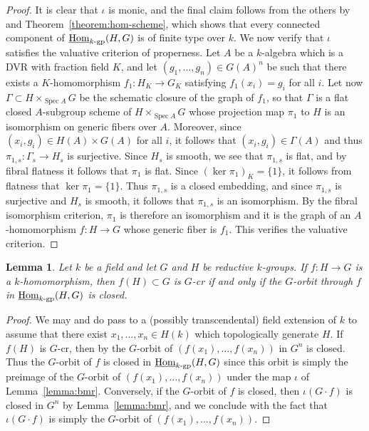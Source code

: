 \documentclass[11pt, letterpaper,english]{amsart}
\theoremstyle{plain}
\newtheorem{lemma}[lem]{Lemma}
\theoremstyle{definition}
\numberwithin{equation}{section}
\numberwithin{lem}{section}
\DeclareMathOperator{\Hom}{Hom}
\DeclareMathOperator{\Spec}{Spec}
\begin{document}
\begin{proof}
    It is clear that $\iota$ is monic, and the final claim follows from the others by \cite[IV\textsubscript{3}, Proposition 8.11.5]{EGA} and Theorem~\ref{theorem:hom-scheme}, which shows that every connected component of $\underline{\Hom}_{k\textrm{-}\rm{gp}}(H, G)$ is of finite type over $k$. We now verify that $\iota$ satisfies the valuative criterion of properness. Let $A$ be a $k$-algebra which is a DVR with fraction field $K$, and let $(g_1, \dots, g_n) \in G(A)^n$ be such that there exists a $K$-homomorphism $f_1: H_K \to G_K$ satisfying $f_1(x_i) = g_i$ for all $i$. Let now $\Gamma \subset H \times_{\Spec A} G$ be the schematic closure of the graph of $f_1$, so that $\Gamma$ is a flat closed $A$-subgroup scheme of $H \times_{\Spec A} G$ whose projection map $\pi_1$ to $H$ is an isomorphism on generic fibers over $A$. Moreover, since $(x_i, g_i) \in H(A) \times G(A)$ for all $i$, it follows that $(x_i, g_i) \in \Gamma(A)$ and thus $\pi_{1,s}: \Gamma_s \to H_s$ is surjective.  Since $H_s$ is smooth, we see that $\pi_{1, s}$ is flat, and by fibral flatness it follows that $\pi_1$ is flat. Since $(\ker \pi_1)_K = \{1\}$, it follows from flatness that $\ker \pi_1 = \{1\}$. Thus $\pi_{1, s}$ is a closed embedding, and since $\pi_{1, s}$ is surjective and $H_s$ is smooth, it follows that $\pi_{1, s}$ is an isomorphism. By the fibral isomorphism criterion, $\pi_1$ is therefore an isomorphism and it is the graph of an $A$-homomorphism $f: H \to G$ whose generic fiber is $f_1$. This verifies the valuative criterion.
\end{proof}

\begin{lemma}\label{lemma:g-cr}
    Let $k$ be a field and let $G$ and $H$ be reductive $k$-groups. If $f: H \to G$ is a $k$-homomorphism, then $f(H) \subset G$ is $G$-cr if and only if the $G$-orbit through $f$ in $\underline{\Hom}_{k\textrm{-}\rm{gp}}(H, G)$ is closed.
\end{lemma}

\begin{proof}
    We may and do pass to a (possibly transcendental) field extension of $k$ to assume that there exist $x_1, \dots, x_n \in H(k)$ which topologically generate $H$. If $f(H)$ is $G$-cr, then by \cite[Proposition 2.16, Theorem 3.1]{BMR05} the $G$-orbit of $(f(x_1), \dots, f(x_n))$ in $G^n$ is closed. Thus the $G$-orbit of $f$ is closed in $\underline{\Hom}_{k\textrm{-}\rm{gp}}(H, G)$ since this orbit is simply the preimage of the $G$-orbit of $(f(x_1), \dots, f(x_n))$ under the map $\iota$ of Lemma~\ref{lemma:bmr}. Conversely, if the $G$-orbit of $f$ is closed, then $\iota(G\cdot f)$ is closed in $G^n$ by Lemma~\ref{lemma:bmr}, and we conclude with the fact that $\iota(G \cdot f)$ is simply the $G$-orbit of $(f(x_1), \dots, f(x_n))$.
\end{proof}
\end{document}
